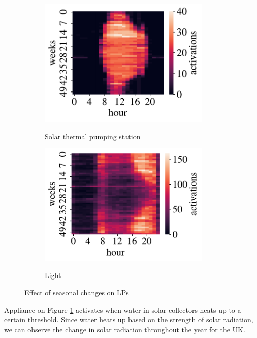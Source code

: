 \begin{figure}[H]
	\begin{subfigure}{.5\textwidth}
		\centering
		\caption{Solar thermal pumping station}
		\includegraphics[width=0.9\textwidth]{../Figures/LPS/solar_thermal_pumping_station.pdf}
		\label{fig:solar_thermal_pumping_station}
	\end{subfigure}%
	\begin{subfigure}{.5\textwidth}
		\centering
		\caption{Light}
		\includegraphics[width=0.9\textwidth]{../Figures/LPS/light.pdf}
		\label{fig:light}
	\end{subfigure}%
	\caption{Effect of seasonal changes on LPs}
	\label{fig:effect_of_season}

\end{figure} 

Appliance on Figure \ref{fig:solar_thermal_pumping_station} activates when water in solar collectors heats up to a certain threshold.
Since water heats up based on the strength of solar radiation, we can observe the change in solar radiation throughout the year for the UK. 

